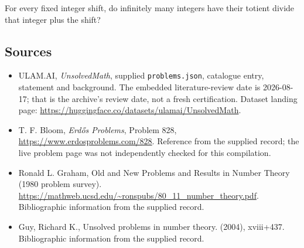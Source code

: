 \documentclass[11pt,a4paper]{article}
\begin{document}
For every fixed integer shift, do infinitely many integers have their totient divide that integer plus the shift?

\subsection{Sources}

{\small

\begin{itemize}

\item[\hypertarget{source:statement:1}{S1}] ULAM.AI, \emph{UnsolvedMath}, supplied \texttt{problems.json}, catalogue entry, statement and background. The embedded literature-review date is 2026-08-17; that is the archive’s review date, not a fresh certification. Dataset landing page: \url{https://huggingface.co/datasets/ulamai/UnsolvedMath}.

\item[\hypertarget{source:statement:2}{S2}] T. F. Bloom, \emph{Erdős Problems}, Problem 828, \url{https://www.erdosproblems.com/828}. Reference from the supplied record; the live problem page was not independently checked for this compilation.

\item[\hypertarget{source:statement:3}{S3}] Ronald L. Graham, Old and New Problems and Results in Number Theory (1980 problem survey). \url{https://mathweb.ucsd.edu/~ronspubs/80_11_number_theory.pdf}. Bibliographic information from the supplied record.

\item[\hypertarget{source:statement:4}{S4}] Guy, Richard K., Unsolved problems in number theory. (2004), xviii+437. Bibliographic information from the supplied record.

\end{itemize}

}

\label{end:statement}
\end{document}
